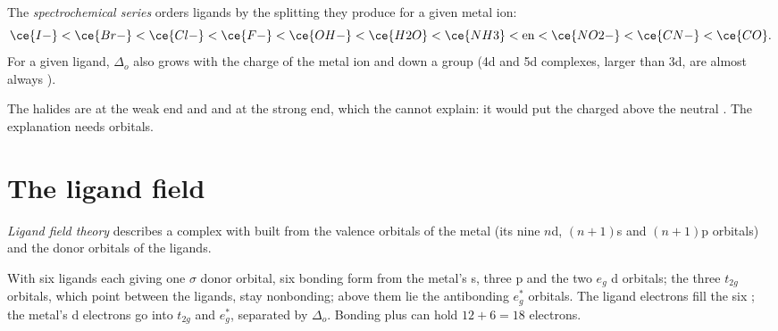\begin{definition}\label{def:b2:ligand-field:spectrochemical}
The \emph{spectrochemical series} orders ligands by the
splitting they produce for a given metal ion:
\[
  \ce{I-} < \ce{Br-} < \ce{Cl-} < \ce{F-} < \ce{OH-} < \ce{H2O} < \ce{NH3} < \text{en} <
  \ce{NO2-} < \ce{CN-} < \ce{CO} .
\]
For a given ligand, $\Delta_o$ also grows with the charge of the metal ion and down a group
(4d and 5d complexes, larger than 3d, are almost always ).
\end{definition}

The halides are at the weak end and  and  at the strong end, which the
 cannot explain: it would put the charged  above the neutral
. The explanation needs orbitals.

\section{The ligand field}

\begin{definition}\label{def:b2:ligand-field:ligand-field}
\emph{Ligand field theory} describes a complex with 
built from the valence orbitals of the metal (its nine $n$d, $(n+1)$s and $(n+1)$p
orbitals) and the donor orbitals of the ligands.
\end{definition}

\begin{proposition}\label{prop:b2:ligand-field:mo-octahedral}
With six ligands each giving one $\sigma$ donor orbital, six bonding  form
from the metal's s, three p and the two $e_g$ d orbitals; the three $t_{2g}$ orbitals, which
point between the ligands, stay nonbonding; above them lie the antibonding $e_g^*$
orbitals. The ligand electrons fill the six ; the metal's d electrons go
into $t_{2g}$ and $e_g^*$, separated by $\Delta_o$. Bonding plus  can hold
$12 + 6 = 18$ electrons.
\end{proposition}

